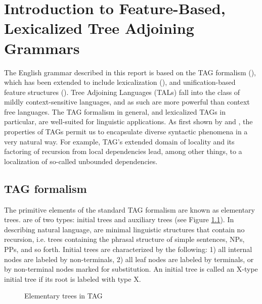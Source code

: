 \chapter{Introduction to Feature-Based, Lexicalized Tree Adjoining Grammars}
\label{intro-FBLTAG}

The English grammar described in this report is based on the TAG formalism
(\cite{joshi75}), which has been extended to include lexicalization
(\cite{schabes88}), and unification-based feature structures
(\cite{vijay91}). Tree Adjoining Languages (TALs) fall into the class of mildly
context-sensitive languages, and as such are more powerful than context free
languages.  The TAG formalism in general, and lexicalized TAGs in particular,
are well-suited for linguistic applications.  As first shown by \cite{joshi85}
and \cite{kj87}, the properties of TAGs permit us to encapsulate diverse
syntactic phenomena in a very natural way.  For example, TAG's extended domain
of locality and its factoring of recursion from local dependencies lead, among
other things, to a localization of so-called unbounded dependencies.

\section{TAG formalism}

The primitive elements of the standard TAG formalism are known as elementary
trees.   are of two types: initial trees and
auxiliary trees (see Figure \ref{elem-fig}).  In describing natural language,
 are minimal linguistic structures that contain no
recursion, i.e. trees containing the phrasal structure of simple sentences,
NPs, PPs, and so forth.  Initial trees are characterized by the following: 1)
all internal nodes are labeled by non-terminals, 2) all leaf nodes are labeled
by terminals, or by non-terminal nodes marked for substitution. An initial tree
is called an X-type initial tree if its root is labeled with type X.

\begin{figure}[htb]
\centering
{}
\caption{Elementary trees in TAG}
\label{elem-fig}
\end{figure}

